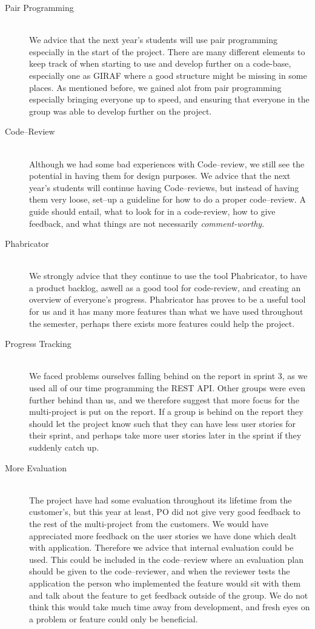 \begin{description}
	\item[Pair Programming] \hfill \\
	We advice that the next year's students will use pair programming especially in the start of the project.
	There are many different elements to keep track of when starting to use and develop further on a code-base, especially one as GIRAF where a good structure might be missing in some places.
	As mentioned before, we gained alot from pair programming especially bringing everyone up to speed, and ensuring that everyone in the group was able to develop further on the project.

	\item[Code--Review] \hfill \\
	Although we had some bad experiences with Code--review, we still see the potential in having them for design purposes.
	We advice that the next year's students will continue having Code--reviews, but instead of having them very loose, set--up a guideline for how to do a proper code--review.
	A guide should entail, what to look for in a code-review, how to give feedback, and what things are not necessarily \textit{comment-worthy}.

	\item[Phabricator] \hfill \\
	We strongly advice that they continue to use the tool Phabricator, to have a product backlog, aswell as a good tool for code-review, and creating an overview of everyone's progress.
	Phabricator has proves to be a useful tool for us and it has many more features than what we have used throughout the semester, perhaps there exists more features could help the project.

	\item[Progress Tracking] \hfill \\
	We faced problems ourselves falling behind on the report in sprint 3, as we used all of our time programming the REST API.
	Other groups were even further behind than us, and we therefore suggest that more focus for the multi-project is put on the report.
	If a group is behind on the report they should let the project know such that they can have less user stories for their sprint, and perhaps take more user stories later in the sprint if they suddenly catch up.

	\item[More Evaluation] \hfill \\
	The project have had some evaluation throughout its lifetime from the customer's, but this year at least, PO did not give very good feedback to the rest of the multi-project from the customers.
	We would have appreciated more feedback on the user stories we have done which dealt with application.
	Therefore we advice that internal evaluation could be used.
	This could be included in the code--review where an evaluation plan should be given to the code--reviewer, and when the reviewer tests the application the person who implemented the feature would sit with them and talk about the feature to get feedback outside of the group.
	We do not think this would take much time away from development, and fresh eyes on a problem or feature could only be beneficial.


\end{description}
